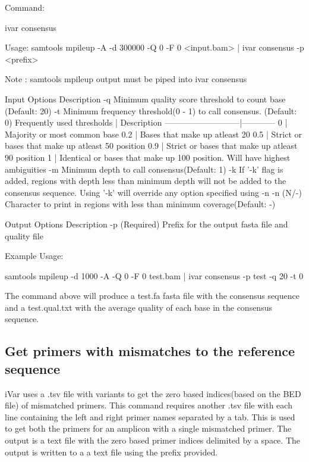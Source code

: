 Command\+: 
\begin{DoxyCode}
ivar consensus

Usage: samtools mpileup -A -d 300000 -Q 0 -F 0 <input.bam> | ivar consensus -p <prefix>

Note : samtools mpileup output must be piped into ivar consensus

Input Options    Description
           -q    Minimum quality score threshold to count base (Default: 20)
           -t    Minimum frequency threshold(0 - 1) to call consensus. (Default: 0)
                 Frequently used thresholds | Description
                 ---------------------------|------------
                                          0 | Majority or most common base
                                        0.2 | Bases that make up atleast 20%
                                        0.5 | Strict or bases that make up atleast 50%
       position
                                        0.9 | Strict or bases that make up atleast 90%
       position
                                          1 | Identical or bases that make up 100%
       position. Will have highest ambiguities
           -m    Minimum depth to call consensus(Default: 1)
           -k    If '-k' flag is added, regions with depth less than minimum depth will not be added to the
       consensus sequence. Using '-k' will override any option specified using -n
           -n    (N/-) Character to print in regions with less than minimum coverage(Default: -)

Output Options   Description
           -p    (Required) Prefix for the output fasta file and quality file
\end{DoxyCode}


Example Usage\+: 
\begin{DoxyCode}
samtools mpileup -d 1000 -A -Q 0 -F 0 test.bam | ivar consensus -p test -q 20 -t 0
\end{DoxyCode}


The command above will produce a test.\+fa fasta file with the consensus sequence and a test.\+qual.\+txt with the average quality of each base in the consensus sequence.\hypertarget{manualpage_autotoc_md18}{}\subsection{Get primers with mismatches to the reference sequence}\label{manualpage_autotoc_md18}
i\+Var uses a .tsv file with variants to get the zero based indices(based on the B\+E\+D file) of mismatched primers. This command requires another .tsv file with each line containing the left and right primer names separated by a tab. This is used to get both the primers for an amplicon with a single mismatched primer. The output is a text file with the zero based primer indices delimited by a space. The output is written to a a text file using the prefix provided.

